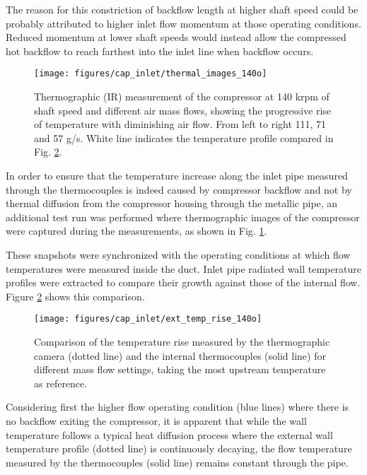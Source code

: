 The reason for this constriction of backflow length at higher shaft speed could be probably attributed to higher inlet flow momentum at those operating conditions. Reduced momentum at lower shaft speeds would instead allow the compressed hot backflow to reach farthest into the inlet line when backflow occurs.

\begin{figure}[!htb]
\centering
\texttt{[image: figures/cap\_inlet/thermal\_images\_140o]}
\caption{Thermographic (IR) measurement of the compressor at 140 krpm of shaft speed and different air mass flows, showing the progressive rise of temperature with diminishing air flow. From left to right 111, 71 and 57 g/s. White line indicates the temperature profile compared in Fig. \ref{fig:temp_ext_comp}.}
\label{fig:thermal_images}
\end{figure}

In order to ensure that the temperature increase along the inlet pipe measured through the thermocouples is indeed caused by compressor backflow and not by thermal diffusion from the compressor housing through the metallic pipe, an additional test run was performed where thermographic images of the compressor were captured during the measurements, as shown in Fig. \ref{fig:thermal_images}.

These snapshots were synchronized with the operating conditions at which flow temperatures were measured inside the duct. Inlet pipe radiated wall temperature profiles were extracted to compare their growth against those of the internal flow. Figure \ref{fig:temp_ext_comp} shows this comparison.

\begin{figure}[!hbt]
\centering
\texttt{[image: figures/cap\_inlet/ext\_temp\_rise\_140o]}
\caption{Comparison of the temperature rise measured by the thermographic camera (dotted line) and the internal thermocouples (solid line) for different mass flow settings, taking the most upstream temperature as reference.}
\label{fig:temp_ext_comp}
\end{figure}

Considering first the higher flow operating condition (blue lines) where there is no backflow exiting the compressor, it is apparent that while the wall temperature follows a typical heat diffusion process where the external wall temperature profile (dotted line) is continuously decaying, the flow temperature measured by the thermocouples (solid line) remains constant through the pipe.

